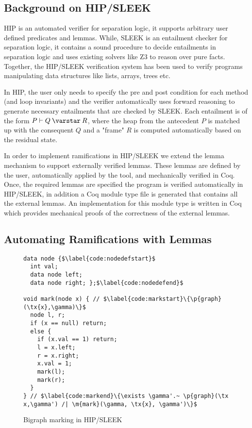 \subsection{Background on HIP/SLEEK}
HIP is an automated verifier for separation logic, it supports arbitrary user defined predicates and lemmas. While, SLEEK
is an entailment checker for separation logic, it contains a sound  procedure to decide entailments in separation logic and uses existing solvers like Z3 to reason over pure facts. Together, the HIP/SLEEK verification system \cite{chin:hipsleek} has been used to verify programs manipulating data structures like lists, arrays, trees etc. 

In HIP, the user only needs to specify the pre and post condition for each method (and loop invariants) and the verifier automatically uses forward reasoning to generate necessary entailments that are checked by SLEEK. Each entailment is of the form $P \vdash Q \scon R$, where the heap from the antecedent $P$ is matched up with the consequent $Q$ and a "frame" $R$ is computed automatically based on the residual state.

In order to implement ramifications in HIP/SLEEK we extend the lemma mechanism \cite{NguyenC08} to support externally verified lemmas. These lemmas are defined by the user, automatically applied by the tool, and mechanically verified in Coq. Once, the required lemmas are specified the program is verified automatically in HIP/SLEEK, in addition a Coq module type file is generated that contains all the external lemmas. An implementation for this module type is written in Coq which provides mechanical proofs of the correctness of the external lemmas.

\subsection{Automating Ramifications with Lemmas}

\begin{figure}[t]
  \begin{lstlisting}
data node {$\label{code:nodedefstart}$
  int val;
  data node left;
  data node right; };$\label{code:nodedefend}$

void mark(node x) { // $\label{code:markstart}\{\p{graph}(\tx{x},\gamma)\}$
  node l, r; 
  if (x == null) return;
  else {
    if (x.val == 1) return;
    l = x.left;
    r = x.right;
    x.val = 1;
    mark(l);
    mark(r);
  }
} // $\label{code:markend}\{\exists \gamma'.~ \p{graph}(\tx x,\gamma') /| \m{mark}(\gamma, \tx{x}, \gamma')\}$
\end{lstlisting}
\caption{Bigraph marking in HIP/SLEEK}
\label{fig:hipmarkgraph}
\end{figure}

